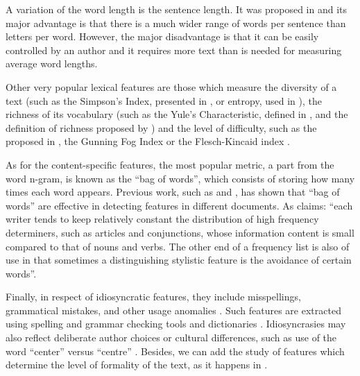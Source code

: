 A variation of the word length is the sentence length. It was proposed in \cite{yule1939sentence} and its major advantage is that there is a much wider range of words per sentence than letters per word. However, the major disadvantage is that it can be easily controlled by an author and it requires more text than is needed for measuring average word lengths.

Other very popular lexical features are those which measure the diversity of a text (such as the Simpson's Index, presented in \cite{simpson1949measurement}, or entropy, used in \cite{holmes1985analysis}), the richness of its vocabulary (such as the Yule's Characteristic, defined in \cite{yule2014statistical}, and the definition of richness proposed by \cite{honore1979some}) and the level of difficulty, such as the proposed in \cite{dale1948formula}, the Gunning Fog Index \citep{wiki:gunning} or the Flesch-Kincaid index \citep{dubay2004principles}.

As for the content-specific features, the most popular metric, a part from the word n-gram, is known as the ``bag of words'', which consists of storing how many times each word appears. Previous work, such as \cite{mihalcea2009lie} and \cite{ott2011finding}, has shown that ``bag of words'' are effective in detecting features in different documents. As \cite{allen1974methods} claims: ``each writer tends to keep relatively constant the distribution of high frequency determiners, such as articles and conjunctions, whose information content is small compared to that of nouns and verbs. The other end of a frequency list is also of use in that sometimes a distinguishing stylistic feature is the avoidance of certain words''.

Finally, in respect of idiosyncratic features, they include misspellings, grammatical mistakes, and other usage anomalies \citep{abbasi2008writeprints}. Such features are extracted using spelling and grammar checking tools and dictionaries \citep{chaski2001empirical}. Idiosyncrasies may also reflect deliberate author choices or cultural differences, such as use of the word ``center'' versus ``centre'' \citep{koppel2003exploiting}. Besides, we can add the study of features which determine the level of formality of the text, as it happens in \cite{sheika2012learning}.